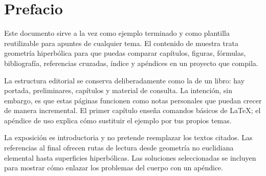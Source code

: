 \chapter*{Prefacio}

Este documento sirve a la vez como ejemplo terminado y como plantilla reutilizable para apuntes de cualquier tema. El contenido de muestra trata geometría hiperbólica para que puedas comparar capítulos, figuras, fórmulas, bibliografía, referencias cruzadas, índice y apéndices en un proyecto que compila.

La estructura editorial se conserva deliberadamente como la de un libro: hay portada, preliminares, capítulos y material de consulta. La intención, sin embargo, es que estas páginas funcionen como notas personales que puedan crecer de manera incremental. El primer capítulo enseña comandos básicos de LaTeX; el apéndice de uso explica cómo sustituir el ejemplo por tus propios temas.

La exposición es introductoria y no pretende reemplazar los textos citados. Las referencias al final ofrecen rutas de lectura desde geometría no euclidiana elemental hasta superficies hiperbólicas. Las soluciones seleccionadas se incluyen para mostrar cómo enlazar los problemas del cuerpo con un apéndice.
